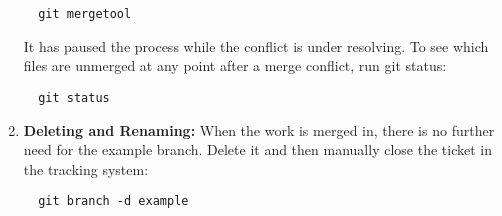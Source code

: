 \documentclass[draftclsnofoot,journal,onecolumn,12pt]{IEEEtran}
\begin{document}
\begin{enumerate}
\begin{verbatim}
  git mergetool
\end{verbatim}
It has paused the process while the conflict is under resolving. To see which files are unmerged at any point after a merge conflict, run git status:
\begin{verbatim}
  git status
\end{verbatim}
\item \textbf{Deleting and Renaming:} When the work is merged in, there is no further need for the example branch. Delete it and then manually close the ticket in the tracking system:
\begin{verbatim}
  git branch -d example
\end{verbatim}
\end{enumerate}

%
%
%
%
\end{document}
